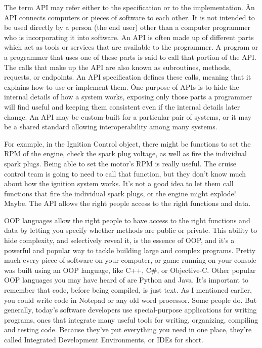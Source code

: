 The term API may refer either to the specification or to the implementation. \v

An API connects computers or pieces of software to each other. It is not intended to be used directly by a person
(the end user) other than a computer programmer who is incorporating it into software. An API is often made up of
different parts which act as tools or services that are available to the programmer. A program or a programmer that
uses one of these parts is said to call that portion of the API. The calls that make up the API are also known as
subroutines, methods, requests, or endpoints. An API specification defines these calls, meaning that it explains how
to use or implement them. \v

One purpose of APIs is to hide the internal details of how a system works, exposing only those parts a programmer
will find useful and keeping them consistent even if the internal details later change. An API may be custom-built
for a particular pair of systems, or it may be a shared standard allowing interoperability among many systems.

\be
For example, in the Ignition Control object, there might be functions to set the RPM of the engine, check the spark
plug voltage, as well as fire the individual spark plugs. Being able to set the motor's RPM is really useful. The
cruise control team is going to need to call that function, but they don't know much about how the ignition system
works. It's not a good idea to let them call functions that fire the individual spark plugs, or the engine might
explode! Maybe. The API allows the right people access to the right functions and data.
\ee

OOP languages allow the right people to have access to the right functions and data by letting you specify whether
methods are public or private. This ability to hide complexity, and selectively reveal it,  is the essence of OOP,
and it's a powerful and popular way to tackle building large and complex programs. Pretty much every piece of
software on your computer, or game running on your console was built using an OOP language, like C++, C\#, or
Objective-C. Other popular OOP languages you may have heard of are Python and Java. It's important to remember that
code, before being compiled, is just text. As I mentioned earlier, you could write code in Notepad or any old word
processor. Some people do. But generally, today's software developers use special-purpose applications for writing
programs, ones that integrate many useful tools for writing, organizing, compiling and testing code. Because they've
put everything you need in one place, they're called Integrated Development Environments, or IDEs for short.

